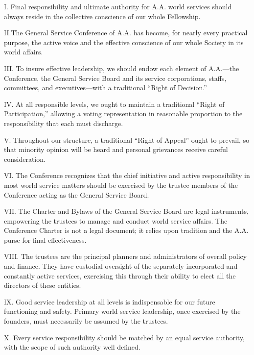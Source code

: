 \begin{biblechapter}
I. Final responsibility 
    and ultimate authority 
    for A.A. world services 
    should always reside in the collective conscience 
    of our whole Fellowship.

\verse II.The General Service Conference of A.A. has become,
    for nearly every practical purpose, 
    the active voice and the effective conscience 
    of our whole Society in its world affairs.

\verse III. To insure effective leadership, 
    we should endow each element of A.A.—the 
    Conference, the General Service Board 
    and its service corporations, staffs, committees,
    and executives—with a traditional “Right of Decision.”

\verse IV. At all responsible levels, 
    we ought to maintain a traditional “Right of Participation,” 
    allowing a voting representation in reasonable proportion 
    to the responsibility that each must discharge.

\verse V. Throughout our structure, 
    a traditional “Right of Appeal” ought to prevail, 
    so that minority opinion will be heard 
    and personal grievances receive careful consideration.

\verse VI. The Conference recognizes that the chief initiative 
    and active responsibility in most world service matters
    should be exercised by the trustee members of the Conference 
    acting as the General Service Board.

\verse VII. The Charter and Bylaws of the General Service Board 
    are legal instruments, 
    empowering the trustees to manage and conduct world service affairs.
    The Conference Charter is not a legal document; 
    it relies upon tradition and the A.A. purse for final effectiveness.

\verse VIII. The trustees are the principal planners and administrators 
    of overall policy and finance.
    They have custodial oversight of the separately incorporated 
    and constantly active services, 
    exercising this through their ability 
    to elect all the directors of these entities.

\verse IX. Good service leadership at all levels is indispensable 
    for our future functioning and safety.
    Primary world service leadership, 
    once exercised by the founders, 
    must necessarily be assumed by the trustees.

\verse X. Every service responsibility 
    should be matched by an equal service authority, 
    with the scope of such authority well defined.


\end{biblechapter}
